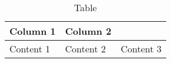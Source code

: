 \documentclass{article}
\begin{document}
\begin{table}[htbp]
\centering	
\caption{Table}
\begin{tabularx}{\textwidth}{|X|X|}
	\hline
	\textbf{Column 1} & \textbf{Column 2} \\
	\hline
    Content 1 & Content 2 & Content 3 \\

	
\end{tabularx}
\end{table}
\end{document}
